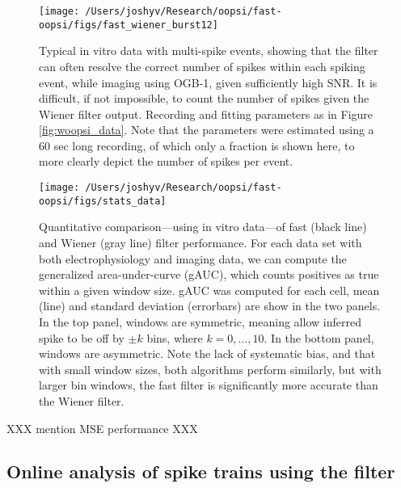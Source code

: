 \begin{figure}[h!]
\centering \texttt{[image: /Users/joshyv/Research/oopsi/fast-oopsi/figs/fast\_wiener\_burst12]}
\caption[\foopsi filter outperforms Wiener filter on multi-spike events]{Typical in vitro data with multi-spike events, showing that the \foopsi filter can often resolve the correct number of spikes within each spiking event, while imaging using OGB-1, given sufficiently high SNR.  It is difficult, if not impossible, to count the number of spikes given the Wiener filter output.  Recording and fitting parameters as in Figure \ref{fig:woopsi_data}. Note that the parameters were estimated using a 60 sec long recording, of which only a fraction is shown here, to more clearly depict the number of spikes per event.  } \label{fig:woopsi_data_doublets}
\end{figure}


\begin{figure}[h!]
\centering \texttt{[image: /Users/joshyv/Research/oopsi/fast-oopsi/figs/stats\_data]}
\caption{Quantitative comparison---using in vitro data---of fast (black line) and Wiener (gray line) filter performance.  For each data set with both electrophysiology and imaging data, we can compute the generalized area-under-curve (gAUC), which counts positives as true within a given window size.  gAUC was computed for each cell, mean (line) and standard deviation (errorbars) are show in the two panels.  In the top panel, windows are symmetric, meaning allow inferred spike to be off by $\pm k$ bins, where $k=0,\ldots, 10$.  In the bottom panel, windows are asymmetric.  Note the lack of systematic bias, and that with small window sizes, both algorithms perform similarly, but with larger bin windows, the fast filter is significantly more accurate than the Wiener filter. } \label{fig:stats-data}
\end{figure}

XXX mention MSE performance XXX




\subsection{Online analysis of spike trains using the \foopsi filter}

